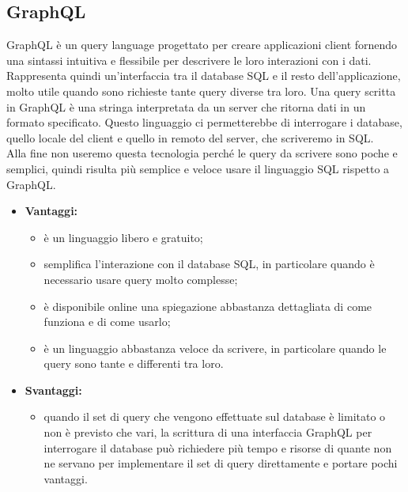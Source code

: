\subsection{GraphQL} 
	GraphQL è un query language progettato per creare applicazioni client fornendo una sintassi intuitiva e flessibile per descrivere le loro interazioni con i dati. Rappresenta quindi un'interfaccia tra il database SQL e il resto dell'applicazione, molto utile quando sono richieste tante query diverse tra loro.
	Una query scritta in GraphQL è una stringa interpretata da un server che ritorna dati in un formato specificato. 
	Questo linguaggio ci permetterebbe di interrogare i database, quello locale del client e quello in remoto del server, che scriveremo in SQL. \\
	Alla fine non useremo questa tecnologia perché le query da scrivere sono poche e semplici, quindi risulta più semplice e veloce usare il linguaggio SQL rispetto a GraphQL. %
	
	\begin{itemize}
		\item \textbf{Vantaggi:}
			\begin{itemize}
				\item è un linguaggio libero e gratuito;
				\item semplifica l'interazione con il database SQL, in particolare quando è necessario usare query molto complesse;
				\item è disponibile online una spiegazione abbastanza dettagliata di come funziona e di come usarlo;
				\item è un linguaggio abbastanza veloce da scrivere, in particolare quando le query sono tante e differenti tra loro.
			\end{itemize}
		\item \textbf{Svantaggi:}
			\begin{itemize}
				\item quando il set di query che vengono effettuate sul database è limitato o non è previsto che vari, la scrittura di una interfaccia GraphQL per interrogare il database può richiedere più tempo e risorse di quante non ne servano per implementare il set di query direttamente e portare pochi vantaggi.
			\end{itemize}
	\end{itemize}


